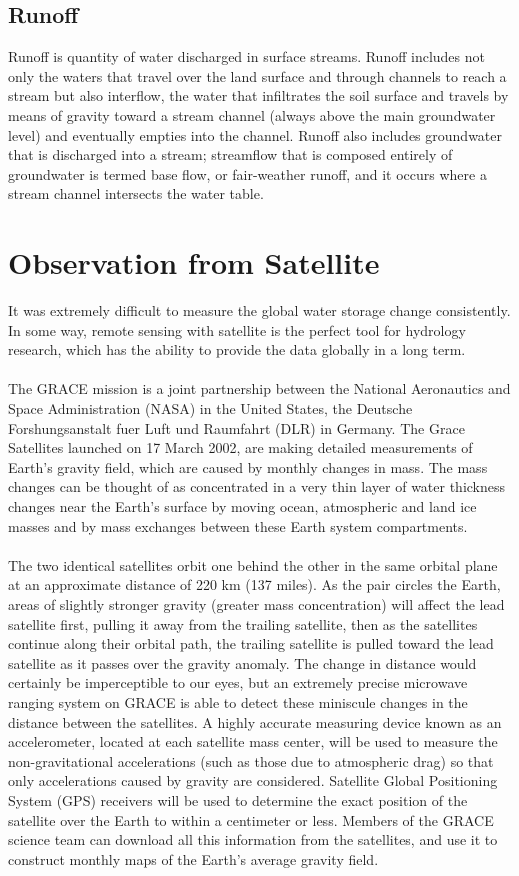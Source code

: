 \subsection{Runoff}
Runoff is quantity of water discharged in surface streams. Runoff includes not only the waters that travel over the land surface and through channels to reach a stream but also interflow, the water that infiltrates the soil surface and travels by means of gravity toward a stream channel (always above the main groundwater level) and eventually empties into the channel. Runoff also includes groundwater that is discharged into a stream; streamflow that is composed entirely of groundwater is termed base flow, or fair-weather runoff, and it occurs where a stream channel intersects the water table.
\section{Observation from Satellite}
It was extremely difficult to measure the global water storage change consistently. In some way, remote sensing with satellite is the perfect tool for hydrology research, which has the ability to provide the data globally in a long term.\\\\
The GRACE mission is a joint partnership between the National Aeronautics and Space Administration (NASA) in the United States, the Deutsche Forshungsanstalt fuer Luft und Raumfahrt (DLR) in Germany. The Grace Satellites launched on 17 March 2002, are making detailed measurements of Earth's gravity field, which are caused by monthly changes in mass. The mass changes can be thought of as concentrated in a very thin layer of water thickness changes near the Earth's surface by moving ocean, atmospheric and land ice masses and by mass exchanges between these Earth system compartments. \\\\
The two identical satellites orbit one behind the other in the same orbital plane at an approximate distance of 220 km (137 miles). As the pair circles the Earth, areas of slightly stronger gravity (greater mass concentration) will affect the lead satellite first, pulling it away from the trailing satellite, then as the satellites continue along their orbital path, the trailing satellite is pulled toward the lead satellite as it passes over the gravity anomaly. The change in distance would certainly be imperceptible to our eyes, but an extremely precise microwave ranging system on GRACE is able to detect these miniscule changes in the distance between the satellites. A highly accurate measuring device known as an accelerometer, located at each satellite mass center, will be used to measure the non-gravitational accelerations (such as those due to atmospheric drag) so that only accelerations caused by gravity are considered. Satellite Global Positioning System (GPS) receivers will be used to determine the exact position of the satellite over the Earth to within a centimeter or less. Members of the GRACE science team can download all this information from the satellites, and use it to construct monthly maps of the Earth's average gravity field. \\\\
